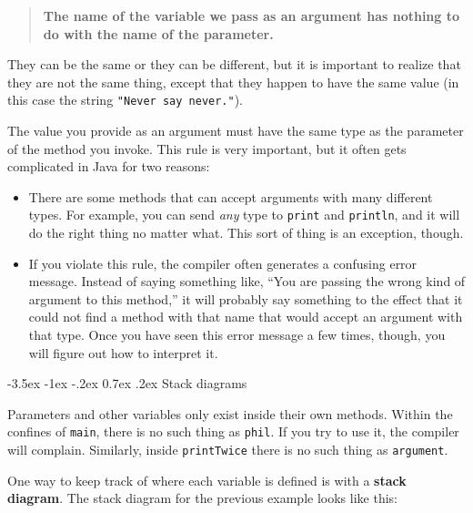 \documentclass{book}
\makeatletter
\renewcommand{\section}{\@startsection 
    {section} {1} {0mm}%
    {-3.5ex \@plus -1ex \@minus -.2ex}%
    {0.7ex \@plus.2ex}%
    {\normalfont\Large\bfseries}}
\makeatother
\begin{document}
\begin{quote}

{\bf The name of the variable we pass as an argument has nothing to do
with the name of the parameter.}

\end{quote}

They can be the same or they can be different, but it is important
to realize that they are not the same thing, except that they happen
to have the same value (in this case the string {\tt "Never say never."}).

The value you provide as an argument must have the same type as
the parameter of the method you invoke.  This rule is very
important, but it often gets complicated in Java for two reasons:

\begin {itemize}

\item There are some methods that can accept arguments with many
different types.  For example, you can send {\em any} type to
{\tt print} and {\tt println}, and it will do the right thing
no matter what.  This sort of thing is an exception, though.

\item If you violate this rule, the compiler often generates
a confusing error message.  Instead of saying something like,
``You are passing the wrong kind of argument to this method,''
it will probably say something to the effect that it could
not find a method with that name that would accept an argument
with that type.  Once you have seen this error message a few
times, though, you will figure out how to interpret it.

\end{itemize}


\section {Stack diagrams}
\label{stack}

Parameters and other
variables only exist inside their own methods.  Within the
confines of {\tt main}, there is no such thing as {\tt phil}.
If you try to use it, the compiler will complain.  Similarly,
inside {\tt printTwice} there is no such thing as {\tt argument}.

One way to keep track of where each variable is defined is
with a {\bf stack diagram}.  The stack diagram for the previous
example looks like this:
\end{document}
